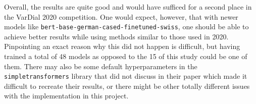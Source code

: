 Overall, the results are quite good and would have sufficed for a second place in the VarDial 2020 competition. One would expect, however, that with newer models like \texttt{bert-base-german-cased-finetuned-swiss}, one should be able to achieve better results while using methods similar to those used in 2020. Pinpointing an exact reason why this did not happen is difficult, but \cite{scherrerHeLjuVarDial20202020} having trained a total of 48 models as opposed to the 15 of this study could be one of them. There may also be some default hyperparameters in the \texttt{simpletransformers} library that \cite{scherrerHeLjuVarDial20202020} did not discuss in their paper which made it difficult to recreate their results, or there might be other totally different issues with the implementation in this project.
